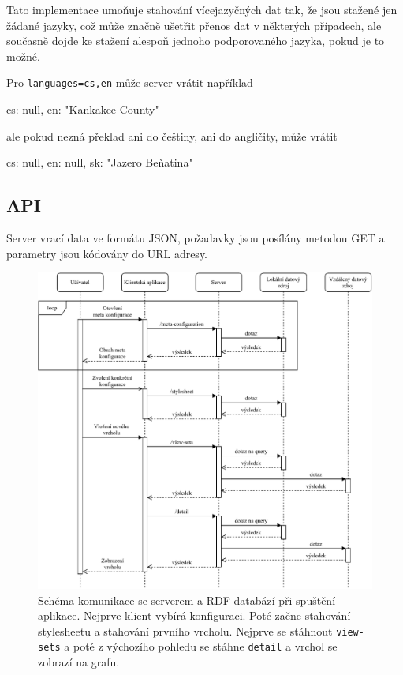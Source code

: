 Tato implementace umoňuje stahování vícejazyčných dat tak, že jsou stažené jen žádané jazyky, což může značně ušetřit přenos dat v některých případech, ale současně dojde ke stažení alespoň jednoho podporovaného jazyka, pokud je to možné.

\begin{prikl}
Pro \texttt{languages=cs,en} může server vrátit například
\begin{code}[frame=none]
{
    cs: null,
    en: "Kankakee County"
}
\end{code}
ale pokud nezná překlad ani do češtiny, ani do angličity, může vrátit
\begin{code}[frame=none]
{
    cs: null,
    en: null,
    sk: "Jazero Beňatina"
}
\end{code}
\end{prikl}

\subsection{API}
Server vrací data ve formátu JSON, požadavky jsou posílány metodou GET a parametry jsou kódovány do URL adresy.

\begin{figure}[p]
    \centering
    \includegraphics[width=\textwidth]{media/sequence-server.pdf}
    \caption{Schéma komunikace se serverem a RDF databází při spuštění aplikace. Nejprve klient vybírá konfiguraci. Poté začne stahování stylesheetu a stahování prvního vrcholu. Nejprve se stáhnout \texttt{view-sets} a poté z výchozího pohledu se stáhne \texttt{detail} a vrchol se zobrazí na grafu.}
\end{figure}

